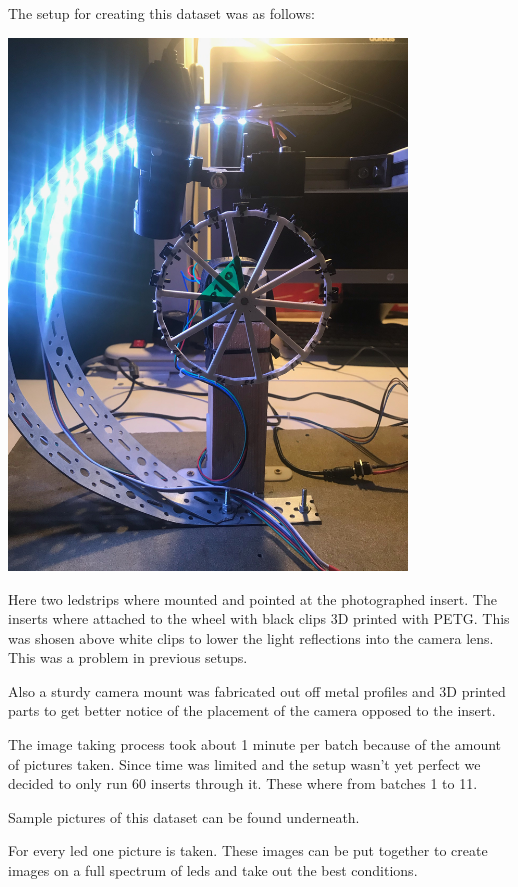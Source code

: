 \documentclass{article}
\begin{document}
The setup for creating this dataset was as follows:

\includegraphics[width=4.166667in, keepaspectratio=true]{./ZimFiles_files/Vision/Dataset/automated_datasets/2_created_datasets/1_Birthday_dataset/IMG_9282.jpeg}

Here two ledstrips where mounted and pointed at the photographed insert. The inserts where attached to the wheel with black clips 3D printed with PETG. This was shosen above white clips to lower the light reflections into the camera lens. This was a problem in previous setups. 

Also a sturdy camera mount was fabricated out off metal profiles and 3D printed parts to get better notice of the placement of the camera opposed to the insert. 

The image taking process took about 1 minute per batch because of the amount of pictures taken. Since time was limited and the setup wasn't yet perfect we decided to only run 60 inserts through it. These where from batches 1 to 11. 

Sample pictures of this dataset can be found underneath. 

For every led one picture is taken. These images can be put together to create images on a full spectrum of leds and take out the best conditions. 
\end{document}

